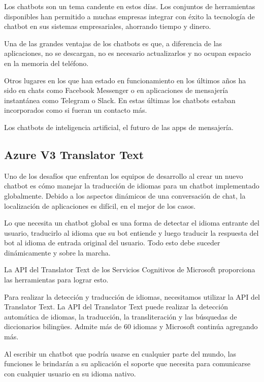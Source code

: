 Los chatbots son un tema candente en estos días. Los conjuntos de herramientas disponibles han permitido a muchas empresas integrar con éxito la tecnología de chatbot en sus sistemas empresariales, ahorrando tiempo y dinero.

Una de las grandes ventajas de los chatbots es que, a diferencia de las aplicaciones, no se descargan, no es necesario actualizarlos y no ocupan espacio en la memoria del teléfono.

Otros lugares en los que han estado en funcionamiento en los últimos años ha sido en chats como Facebook Messenger o en aplicaciones de mensajería instantánea como Telegram o Slack. En estas últimas los chatbots estaban incorporados como si fueran un contacto más.

Los chatbots de inteligencia artificial, el futuro de las apps de mensajería.

\subsection{Azure V3 Translator Text}

Uno de los desafíos que enfrentan los equipos de desarrollo al crear un nuevo chatbot es cómo manejar la traducción de idiomas para un chatbot implementado globalmente. Debido a los aspectos dinámicos de una conversación de chat, la localización de aplicaciones es difícil, en el mejor de los casos.

Lo que necesita un chatbot global es una forma de detectar el idioma entrante del usuario, traducirlo al idioma que su bot entiende y luego traducir la respuesta del bot al idioma de entrada original del usuario. Todo esto debe suceder dinámicamente y sobre la marcha.

La API del Translator Text de los Servicios Cognitivos de Microsoft proporciona las herramientas para lograr esto.

Para realizar la detección y traducción de idiomas, necesitamos utilizar la API del Translator Text. La API del Translator Text puede realizar la detección automática de idiomas, la traducción, la transliteración y las búsquedas de diccionarios bilingües. Admite más de 60 idiomas y Microsoft continúa agregando más.

Al escribir un chatbot que podría usarse en cualquier parte del mundo, las funciones le brindarán a su aplicación el soporte que necesita para comunicarse con cualquier usuario en su idioma nativo.
